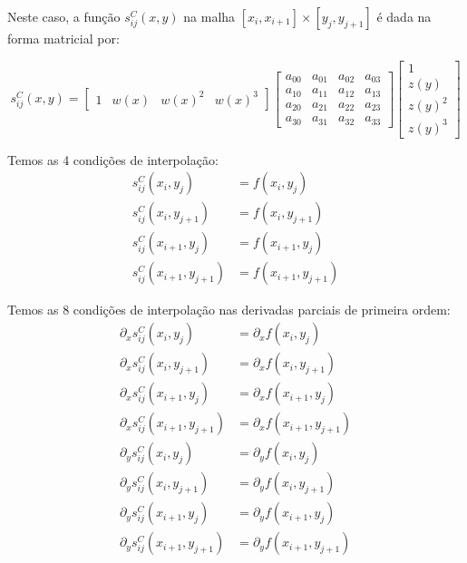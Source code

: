 \documentclass[a4paper, 12pt]{article}
\begin{document}
Neste caso, a função $s_{ij}^C(x,y)$ na malha $[x_i, x_{i+1}] \times [y_j,
y_{j+1}]$ é dada na forma matricial por:

\[
    s_{ij}^C(x,y) =
\begin{bmatrix}
    1 & w{(x)} & w{(x)}^2 & w{(x)}^3
\end{bmatrix}
\begin{bmatrix}
    a_{00} & a_{01} & a_{02} & a_{03}\\
    a_{10} & a_{11} & a_{12} & a_{13}\\
    a_{20} & a_{21} & a_{22} & a_{23}\\
    a_{30} & a_{31} & a_{32} & a_{33}
\end{bmatrix}
\begin{bmatrix}
    1 \\
    z{(y)} \\
    z{(y)}^2 \\
    z{(y)}^3
\end{bmatrix}
\]

Temos as 4 condições de interpolação:
\begin{align}
    s_{ij}^C(x_i,y_j)&=f(x_i, y_j)\tag{1} \\
    s_{ij}^C(x_i,y_{j + 1})&=f(x_i, y_{j + 1})\tag{2}\\
    s_{ij}^C(x_{i + 1},y_j)&=f(x_{i + 1}, y_j)\tag{3}\\
    s_{ij}^C(x_{i + 1},y_{j + 1})&=f(x_{i + 1}, y_{j + 1})\tag{4}
\end{align}

Temos as 8 condições de interpolação nas derivadas parciais de primeira ordem:
\begin{align}
    \partial_{x}s_{ij}^C(x_{i}, y_{j})      &= \partial_{x}f(x_{i}, y_{j}) \tag{5}      \\
    \partial_{x}s_{ij}^C(x_{i}, y_{j+1})    &= \partial_{x}f(x_{i}, y_{j+1}) \tag{6}    \\
    \partial_{x}s_{ij}^C(x_{i+1}, y_{j})    &= \partial_{x}f(x_{i+1}, y_{j}) \tag{7}    \\
    \partial_{x}s_{ij}^C(x_{i+1}, y_{j+1})  &= \partial_{x}f(x_{i+1}, y_{j+1}) \tag{8}  \\
    \partial_{y}s_{ij}^C(x_{i}, y_{j})      &= \partial_{y}f(x_{i}, y_{j}) \tag{9}      \\
    \partial_{y}s_{ij}^C(x_{i}, y_{j+1})    &= \partial_{y}f(x_{i}, y_{j+1}) \tag{10}   \\
    \partial_{y}s_{ij}^C(x_{i+1}, y_{j})    &= \partial_{y}f(x_{i+1}, y_{j}) \tag{11}   \\
    \partial_{y}s_{ij}^C(x_{i+1}, y_{j+1})  &= \partial_{y}f(x_{i+1}, y_{j+1}) \tag{12}
\end{align}
\end{document}

